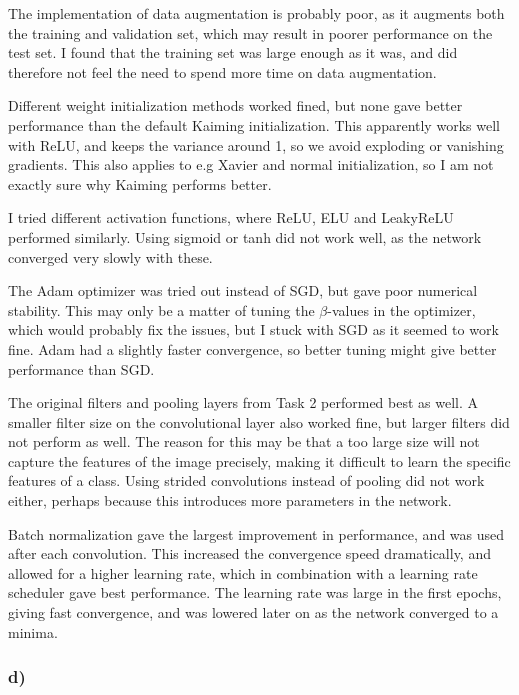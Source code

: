 The implementation of data augmentation is probably poor, as it augments both the training and validation set, which may result in poorer performance on the test set. I found that the training set was large enough as it was, and did therefore not feel the need to spend more time on data augmentation.

Different weight initialization methods worked fined, but none gave better performance than the default Kaiming initialization. This apparently works well with ReLU, and keeps the variance around 1, so we avoid exploding or vanishing gradients. This also applies to e.g Xavier and normal initialization, so I am not exactly sure why Kaiming performs better.

I tried different activation functions, where ReLU, ELU and LeakyReLU performed similarly. Using sigmoid or tanh did not work well, as the network converged very slowly with these. 

The Adam optimizer was tried out instead of SGD, but gave poor numerical stability. This may only be a matter of tuning the $\beta$-values in the optimizer, which would probably fix the issues, but I stuck with SGD as it seemed to work fine. Adam had a slightly faster convergence, so better tuning might give better performance than SGD.

The original filters and pooling layers from Task 2 performed best as well. A smaller filter size on the convolutional layer also worked fine, but larger filters did not perform as well. The reason for this may be that a too large size will not capture the features of the image precisely, making it difficult to learn the specific features of a class. Using strided convolutions instead of pooling did not work either, perhaps because this introduces more parameters in the network.

Batch normalization gave the largest improvement in performance, and was used after each convolution. This increased the convergence speed dramatically, and allowed for a higher learning rate, which in combination with a learning rate scheduler gave best performance. The learning rate was large in the first epochs, giving fast convergence, and was lowered later on as the network converged to a minima.

\subsubsection*{d)}

